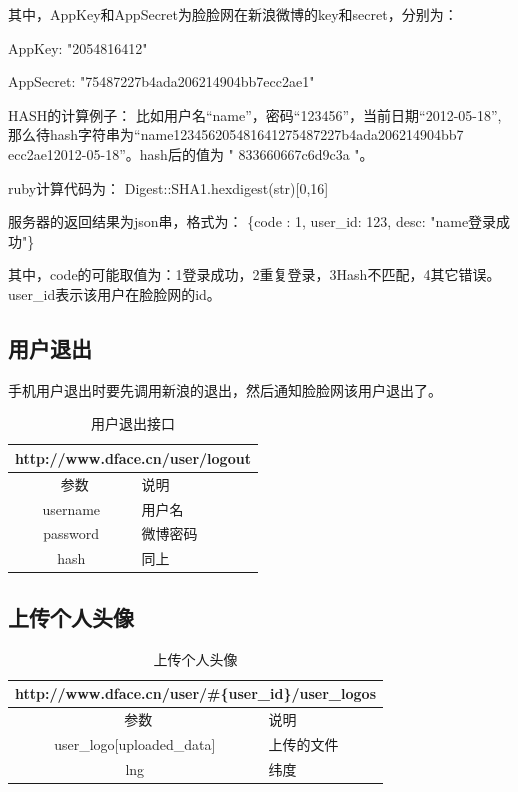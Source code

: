 \documentclass[cs4size]{ctexartutf8}
\begin{document}
其中，AppKey和AppSecret为脸脸网在新浪微博的key和secret，分别为：

AppKey: "2054816412"

AppSecret: "75487227b4ada206214904bb7ecc2ae1"
  

HASH的计算例子：
比如用户名“name”，密码“123456”，当前日期“2012-05-18”,那么待hash字符串为“name123456205481641275487227b4ada206214904bb7
ecc2ae12012-05-18”。hash后的值为 " 833660667c6d9c3a "。

ruby计算代码为：
Digest::SHA1.hexdigest(str)[0,16]



服务器的返回结果为json串，格式为：
\{code : 1, user\_id: 123, desc: "name登录成功"\}

其中，code的可能取值为：1登录成功，2重复登录，3Hash不匹配，4其它错误。user\_id表示该用户在脸脸网的id。




\subsection{用户退出}
手机用户退出时要先调用新浪的退出，然后通知脸脸网该用户退出了。

\begin{table}[H]
   \begin{center}
\begin{tabular}{|c|p{12cm}|}
\hline
\multicolumn{2}{|c|}{http://www.dface.cn/user/logout} \\
\hline\hline
 \  参数  &  说明  \\
\hline
 username  &  用户名\\
\hline
 password  &  微博密码\\ 
\hline
 hash  &  同上\\
\hline
\end{tabular}
\caption{用户退出接口}
   \end{center}
\end{table}


\subsection{上传个人头像}

\begin{table}[H]
   \begin{center}
\begin{tabular}{|c|p{12cm}|}
\hline
\multicolumn{2}{|c|}{http://www.dface.cn/user/\#\{user\_id\}/user\_logos} \\
\hline\hline
 \  参数  &  说明  \\
\hline
 user\_logo[uploaded\_data]  &  上传的文件\\
\hline
 lng  &  纬度\\ 
\hline
\end{tabular}
\caption{上传个人头像}
   \end{center}
\end{table}
\end{document}
